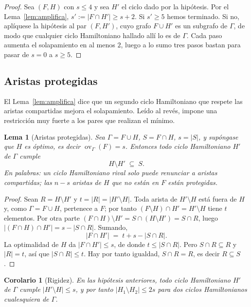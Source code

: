 \documentclass[11pt,a4paper]{article}
\newtheorem{lema}[teorema]{Lema}
\newtheorem{corolario}[teorema]{Corolario}
\theoremstyle{definition}
\theoremstyle{remark}
\newcommand{\ov}{\operatorname{ov}}
\begin{document}
\begin{proof}
Sea $(F,H)$ con $s\le4$ y sea $H'$ el ciclo dado por la hipótesis. Por el Lema~\ref{lem:amplifica}, $s':=|F\cap H'|\ge s+2$. Si $s'\ge5$ hemos terminado. Si no, aplíquese la hipótesis al par $(F,H')$, cuyo grafo $F\cup H'$ es un subgrafo de $\Gamma$, de modo que cualquier ciclo Hamiltoniano hallado allí lo es de $\Gamma$. Cada paso aumenta el solapamiento en al menos $2$, luego a lo sumo tres pasos bastan para pasar de $s=0$ a $s\ge5$.
\end{proof}

\subsection{Aristas protegidas}

El Lema~\ref{lem:amplifica} dice que un segundo ciclo Hamiltoniano que respete las aristas compartidas mejora el solapamiento. Leído al revés, impone una restricción muy fuerte a los pares que realizan el mínimo.

\begin{lema}[Aristas protegidas]\label{lem:protegidas}
Sea $\Gamma=F\cup H$, $S=F\cap H$, $s=|S|$, y supóngase que $H$ es óptimo, es decir $\ov_\Gamma(F)=s$. Entonces todo ciclo Hamiltoniano $H'$ de $\Gamma$ cumple
\[
H\setminus H'\;\subseteq\;S .
\]
En palabras: un ciclo Hamiltoniano rival solo puede renunciar a aristas \emph{compartidas}; las $n-s$ aristas de $H$ que no están en $F$ están protegidas.
\end{lema}

\begin{proof}
Sean $R=H\setminus H'$ y $t=|R|=|H'\setminus H|$. Toda arista de $H'\setminus H$ está fuera de $H$ y, como $\Gamma=F\cup H$, pertenece a $F$; por tanto $(F\setminus H)\cap H'=H'\setminus H$ tiene $t$ elementos. Por otra parte $(F\cap H)\setminus H'=S\cap(H\setminus H')=S\cap R$, luego $|(F\cap H)\cap H'|=s-|S\cap R|$. Sumando,
\[
|F\cap H'|\;=\;t+s-|S\cap R| .
\]
La optimalidad de $H$ da $|F\cap H'|\le s$, de donde $t\le|S\cap R|$. Pero $S\cap R\subseteq R$ y $|R|=t$, así que $|S\cap R|\le t$. Hay por tanto igualdad, $S\cap R=R$, es decir $R\subseteq S$.
\end{proof}

\begin{corolario}[Rigidez]\label{cor:rigidez}
En las hipótesis anteriores, todo ciclo Hamiltoniano $H'$ de $\Gamma$ cumple $|H'\setminus H|\le s$, y por tanto $|H_1\setminus H_2|\le2s$ para dos ciclos Hamiltonianos cualesquiera de $\Gamma$.
\end{corolario}
\end{document}

